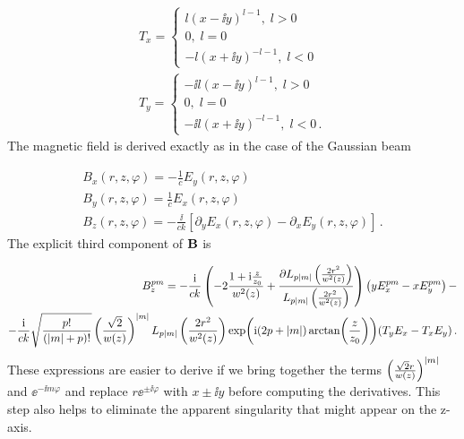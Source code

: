\documentclass[12pt, class=report, crop=false]{standalone}
\begin{document}
\begin{subequations}
  \begin{align}
    T_x =
    \begin{cases}
      l (x - \ii y)^{l-1} , \; l>0 \\
      0,\;l=0\\
      -l(x+\ii y)^{-l-1},\; l<0
    \end{cases} \\
    T_y =
    \begin{cases}
      -\ii l (x - \ii y)^{l-1} , \; l>0 \\
      0,\;l=0\\
      -\ii l(x+\ii y)^{-l-1},\; l<0\,.
    \end{cases}
  \end{align}
\end{subequations}
The magnetic field is derived exactly as in the case of the Gaussian beam

\begin{subequations}
  \begin{align}
    B_x(r,z,\varphi) = -\frac{1}{c}E_y(r,z,\varphi)\\
    B_y(r,z,\varphi) = \frac{1}{c}E_x(r,z,\varphi)\\
    B_z (r,z,\varphi) = -\frac{\ii}{ck} \left[ \partial_y E_x (r,z,\varphi) - \partial_x E_y (r,z,\varphi) \right] \,.
  \end{align}
\end{subequations}
The explicit third component of \(\vb{B}\) is

\begin{equation}
  \begin{aligned}
  B_z^{pm} = - \frac{\mathrm{i}}{ck} \left(-2\frac{1+\mathrm{i}\frac{z}{z_0}}{w^2(z)} +\frac{\partial L_{p\abs{m}}\left(\frac{2r^2}{w^2(z)}\right)}{L_{p\abs{m}}\left(\frac{2r^2}{w^2(z)}\right)}\right) \left( yE_x^{pm} - xE_y^{pm} \right) - \\
  -\frac{\mathrm{i}}{ck}\sqrt{\frac{p!}{(\abs{m}+p)!}} \left(\frac{\sqrt{2}}{w(z)}\right)^{\abs{m}} L_{p\abs{m}} \left(\frac{2r^2}{w^2(z)}\right) \exp(\mathrm{i} (2p+\abs{m}) \arctan(\frac{z}{z_0})) (T_y E_x - T_x E_y)\,.
  \end{aligned}
\end{equation}
These expressions are easier to derive if we bring together the terms \(\left(\frac{\sqrt{2}r}{w(z)}\right)^{\abs{m}}\) and \(\ee^{-\ii m \varphi}\) and replace \(r\ee^{\pm\ii \varphi}\) with \(x\pm\ii y\) before computing the derivatives. This step also helps to eliminate the apparent singularity that might appear on the z-axis.
\end{document}

